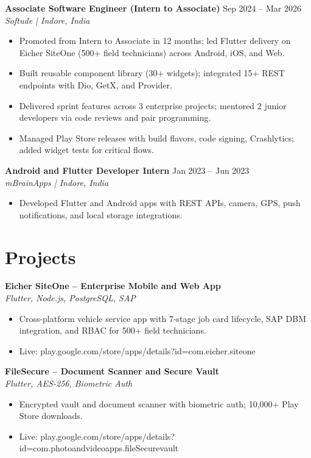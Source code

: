 \documentclass[a4paper,10pt]{article}
\newcommand{\resumeItem}[1]{\item\small{#1\vspace{-1pt}}}
\begin{document}
\vspace{4pt}

\textbf{Associate Software Engineer (Intern to Associate)} \hfill Sep 2024 -- Mar 2026 \\
\textit{Softude | Indore, India}
\begin{itemize}[leftmargin=0.15in, label={\textbullet}, itemsep=0pt]
  \resumeItem{Promoted from Intern to Associate in 12 months; led Flutter delivery on Eicher SiteOne (500+ field technicians) across Android, iOS, and Web.}
  \resumeItem{Built reusable component library (30+ widgets); integrated 15+ REST endpoints with Dio, GetX, and Provider.}
  \resumeItem{Delivered sprint features across 3 enterprise projects; mentored 2 junior developers via code reviews and pair programming.}
  \resumeItem{Managed Play Store releases with build flavors, code signing, Crashlytics; added widget tests for critical flows.}
\end{itemize}

\vspace{4pt}

\textbf{Android and Flutter Developer Intern} \hfill Jan 2023 -- Jun 2023 \\
\textit{mBrainApps | Indore, India}
\begin{itemize}[leftmargin=0.15in, label={\textbullet}, itemsep=0pt]
  \resumeItem{Developed Flutter and Android apps with REST APIs, camera, GPS, push notifications, and local storage integrations.}
\end{itemize}

\section{Projects}

\textbf{Eicher SiteOne -- Enterprise Mobile and Web App} \\
\textit{Flutter, Node.js, PostgreSQL, SAP}
\begin{itemize}[leftmargin=0.15in, label={\textbullet}, itemsep=0pt]
  \resumeItem{Cross-platform vehicle service app with 7-stage job card lifecycle, SAP DBM integration, and RBAC for 500+ field technicians.}
  \resumeItem{Live: play.google.com/store/apps/details?id=com.eicher.siteone}
\end{itemize}

\vspace{2pt}

\textbf{FileSecure -- Document Scanner and Secure Vault} \\
\textit{Flutter, AES-256, Biometric Auth}
\begin{itemize}[leftmargin=0.15in, label={\textbullet}, itemsep=0pt]
  \resumeItem{Encrypted vault and document scanner with biometric auth; 10,000+ Play Store downloads.}
  \resumeItem{Live: play.google.com/store/apps/details?id=com.photoandvideoapps.fileSecurevault}
\end{itemize}
\end{document}
